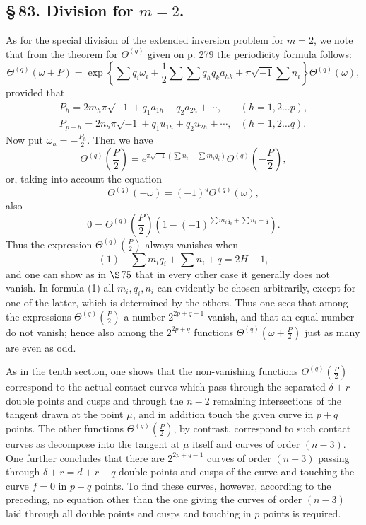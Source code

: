 \documentclass[10pt]{article}
\begin{document}
\subsection*{\S\,83. Division for \(m=2\).}

As for the special division of the extended inversion problem for \(m=2\), we note that from the theorem for \(\Theta^{(q)}\) given on p. 279 the periodicity formula follows:
\[
\Theta^{(q)}(\omega+P)=
\exp\!\left\{\sum q_i\omega_i+\frac12\sum\sum q_hq_ka_{hk}
+\pi\sqrt{-1}\sum n_i\right\}\Theta^{(q)}(\omega),
\]
provided that
\[
\begin{array}{ll}
P_h=2m_h\pi\sqrt{-1}+q_1a_{1h}+q_2a_{2h}+\cdots,&(h=1,2\ldots p),\\
P_{p+h}=2n_h\pi\sqrt{-1}+q_1u_{1h}+q_2u_{2h}+\cdots,&(h=1,2\ldots q).
\end{array}
\]
Now put \(\omega_h=-\frac{P_h}{2}\). Then we have
\[
\Theta^{(q)}\!\left(\frac P2\right)
=e^{\pi\sqrt{-1}\left(\sum n_i-\sum m_iq_i\right)}
\Theta^{(q)}\!\left(-\frac P2\right),
\]
or, taking into account the equation
\[
\Theta^{(q)}(-\omega)=(-1)^q\Theta^{(q)}(\omega),
\]
also
\[
0=\Theta^{(q)}\!\left(\frac P2\right)
\left(1-(-1)^{\sum m_iq_i+\sum n_i+q}\right).
\]
Thus the expression \(\Theta^{(q)}\!\left(\frac P2\right)\) always vanishes when
\[
(1)\quad \sum m_iq_i+\sum n_i+q=2H+1,
\]
and one can show as in \(\S\,75\) that in every other case it generally does not vanish. In formula (1) all \(m_i,q_i,n_i\) can evidently be chosen arbitrarily, except for one of the latter, which is determined by the others. Thus one sees that among the expressions \(\Theta^{(q)}\!\left(\frac P2\right)\) a number \(2^{2p+q-1}\) vanish, and that an equal number do not vanish; hence also among the \(2^{2p+q}\) functions \(\Theta^{(q)}\!\left(\omega+\frac P2\right)\) just as many are even as odd.

As in the tenth section, one shows that the non-vanishing functions \(\Theta^{(q)}\!\left(\frac P2\right)\) correspond to the actual contact curves which pass through the separated \(\delta+r\) double points and cusps and through the \(n-2\) remaining intersections of the tangent drawn at the point \(\mu\), and in addition touch the given curve in \(p+q\) points. The other functions \(\Theta^{(q)}\!\left(\frac P2\right)\), by contrast, correspond to such contact curves as decompose into the tangent at \(\mu\) itself and curves of order \((n-3)\). One further concludes that there are \(2^{2p+q-1}\) curves of order \((n-3)\) passing through \(\delta+r=d+r-q\) double points and cusps of the curve and touching the curve \(f=0\) in \(p+q\) points. To find these curves, however, according to the preceding, no equation other than the one giving the curves of order \((n-3)\) laid through all double points and cusps and touching in \(p\) points is required.
\end{document}
